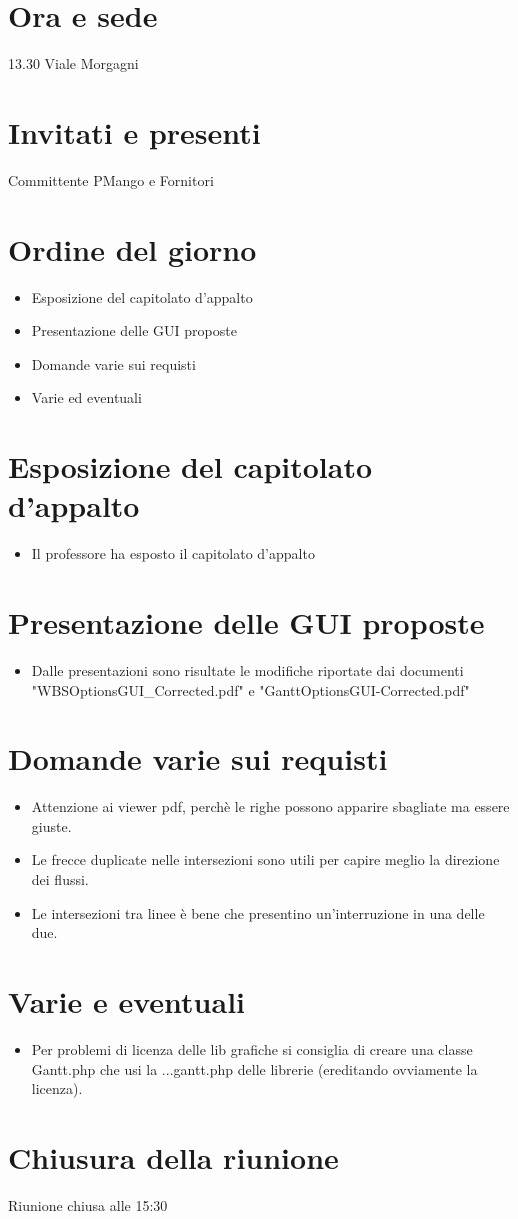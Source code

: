 \section*{Ora e sede}
13.30 Viale Morgagni

\section*{Invitati e presenti}
Committente PMango e Fornitori

\section*{Ordine del giorno}
\begin{itemize}
  \item Esposizione del capitolato d'appalto
  \item Presentazione delle GUI proposte
  \item Domande varie sui requisti
  \item Varie ed eventuali
\end{itemize}

\section*{Esposizione del capitolato d'appalto}
\begin{itemize}
  \item Il professore ha esposto il capitolato d'appalto  
\end{itemize}

\section*{Presentazione delle GUI proposte}
\begin{itemize}
  \item Dalle presentazioni sono risultate le modifiche riportate dai documenti "WBSOptionsGUI_Corrected.pdf" e "GanttOptionsGUI-Corrected.pdf"
\end{itemize}

\section*{Domande varie sui requisti}
\begin{itemize}
  \item Attenzione ai viewer pdf, perchè le righe possono apparire sbagliate ma essere giuste.
  \item Le frecce duplicate nelle intersezioni sono utili per capire meglio la direzione dei flussi.
  \item Le intersezioni tra linee è bene che presentino un'interruzione in una delle due.
\end{itemize}
 	 
\section*{Varie e eventuali}
\begin{itemize}
  \item Per problemi di licenza delle lib grafiche si consiglia di creare una classe Gantt.php che usi la ...gantt.php delle librerie (ereditando ovviamente la licenza).   
\end{itemize}

\section*{Chiusura della riunione}
Riunione chiusa alle 15:30